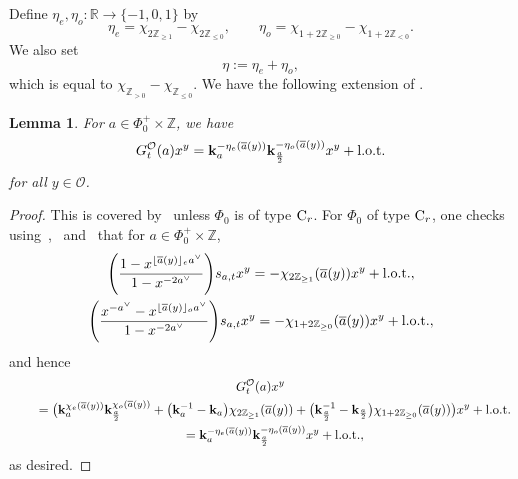 \documentclass[pdftex]{sigma}
\numberwithin{equation}{section}
\newtheorem{Lemma}[Theorem]{Lemma}
\begin{document}
Define $\eta_e,\eta_o\colon \mathbb{R}\rightarrow\{-1,0,1\}$ by
\begin{equation*}%
\eta_e=\chi_{2\mathbb{Z}_{\geq 1}}-\chi_{2\mathbb{Z}_{\leq 0}},\qquad
\eta_o=\chi_{1+2\mathbb{Z}_{\geq 0}}-\chi_{1+2\mathbb{Z}_{<0}}.
\end{equation*}
We also set
\begin{equation*}%
\eta:=\eta_e+\eta_o,
\end{equation*}
which is equal to $\chi_{\mathbb{Z}_{>0}}-\chi_{\mathbb{Z}_{\leq 0}}$. We have the following extension of
\cite[Lemma~5.27]{SSV2}.

\begin{Lemma}\label{lemG}
For $a\in\Phi_0^+\times\mathbb{Z}$, we have
\[
G_{t}^\mathcal{O}(a)x^y=\mathbf{k}_a^{-\eta_e(\overline{a}(y))}\mathbf{k}_{\frac{a}{2}}^{-\eta_o(\overline{a}(y))}x^y+ {\rm l.o.t.}
\]
for all $y\in\mathcal{O}$.
\end{Lemma}

\begin{proof}
This is covered by~\cite[Lemma~5.27]{SSV2} unless $\Phi_0$ is of type ${\rm C}_r$. For $\Phi_0$ of type ${\rm C}_r$, one checks using~\cite[Lemma~4.3\,(1)]{SSV2},~\cite[Proposition~5.20]{SSV2}
and~\cite[Lemma~5.24]{SSV2} that for $a\in\Phi_0^+\times\mathbb{Z}$,
\begin{gather*}
\Biggl(\frac{1-x^{\lfloor\overline{a}(y)\rfloor_e a^\vee}}{1-x^{-2a^\vee}}\Biggl)s_{a,t}x^y=-\chi_{2\mathbb{Z}_{\geq 1}}(\overline{a}(y))x^y+ {\rm l.o.t.},\\
\Biggl(\frac{x^{-a^\vee}-x^{\lfloor\overline{a}(y)\rfloor_o a^\vee}}{1-x^{-2a^\vee}}\Biggl)s_{a,t}x^y=-\chi_{1+2\mathbb{Z}_{\geq 0}}(\overline{a}(y))x^y+ {\rm l.o.t.},
\end{gather*}
and hence
\begin{gather*}
G_{t}^\mathcal{O}(a)x^y\\
\qquad{}=\bigl(\mathbf{k}_a^{\chi_{e}(\overline{a}(y))}\mathbf{k}_{\frac{a}{2}}^{\chi_{o}(\overline{a}(y))}
+\bigl(\mathbf{k}_a^{-1}-\mathbf{k}_a\bigr)\chi_{2\mathbb{Z}_{\geq 1}}(\overline{a}(y))+
\bigl(\mathbf{k}_{\frac{a}{2}}^{-1}-\mathbf{k}_{\frac{a}{2}}\bigr)\chi_{1+2\mathbb{Z}_{\geq 0}}(\overline{a}(y))\bigr)x^y+ {\rm l.o.t.}\\
\qquad{}=\mathbf{k}_a^{-\eta_e(\overline{a}(y))}\mathbf{k}_{\frac{a}{2}}^{-\eta_o(\overline{a}(y))}x^y+ {\rm l.o.t.},
\end{gather*}
as desired.
\end{proof}
\end{document}
